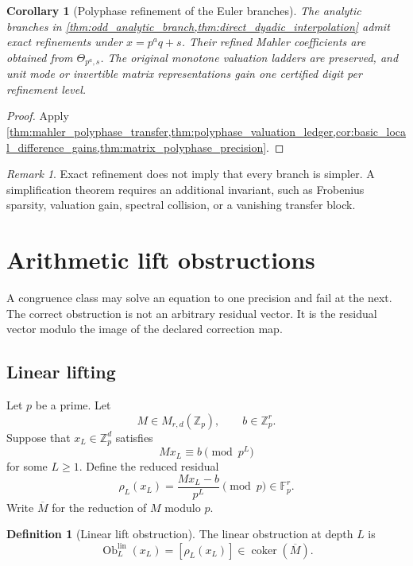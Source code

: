 \documentclass{aomart}
\newtheorem{corollary}[corollary]{Corollary}
\theoremstyle{definition}
\newtheorem{definition}[definition]{Definition}
\theoremstyle{remark}
\newtheorem{remark}[remark]{Remark}
\newcommand{\FF}{\mathbb F}
\newcommand{\Zp}{\mathbb Z_p}
\newcommand{\coker}{\operatorname{coker}}
\begin{document}
\begin{corollary}[Polyphase refinement of the Euler branches]\label{cor:euler_polyphase_refinement}
The analytic branches in \cref{thm:odd_analytic_branch,thm:direct_dyadic_interpolation} admit exact refinements under \(x=p^aq+s\). Their refined Mahler coefficients are obtained from \(\Theta_{p^a,s}\). The original monotone valuation ladders are preserved, and unit mode or invertible matrix representations gain one certified digit per refinement level.
\end{corollary}

\begin{proof}
Apply \cref{thm:mahler_polyphase_transfer,thm:polyphase_valuation_ledger,cor:basic_local_difference_gains,thm:matrix_polyphase_precision}.
\end{proof}

\begin{remark}\label{rem:polyphase_boundary}
Exact refinement does not imply that every branch is simpler. A simplification theorem requires an additional invariant, such as Frobenius sparsity, valuation gain, spectral collision, or a vanishing transfer block.
\end{remark}
\section{Arithmetic lift obstructions}\label{sec:lifting}

A congruence class may solve an equation to one precision and fail at the next. The correct obstruction is not an arbitrary residual vector. It is the residual vector modulo the image of the declared correction map.

\subsection{Linear lifting}

Let \(p\) be a prime. Let
\[
M\in M_{r,d}(\Zp),
\qquad
b\in\Zp^r.
\]
Suppose that \(x_L\in\Zp^d\) satisfies
\[
Mx_L\equiv b\pmod {p^L}
\]
for some \(L\geq1\). Define the reduced residual
\[
\rho_L(x_L)
=
\frac{Mx_L-b}{p^L}
\pmod p
\in\FF_p^r.
\]
Write \(\overline M\) for the reduction of \(M\) modulo \(p\).

\begin{definition}[Linear lift obstruction]\label{def:linear_lift_obstruction}
The linear obstruction at depth \(L\) is
\[
\boxed{
\operatorname{Ob}^{\mathrm{lin}}_L(x_L)
=
[\rho_L(x_L)]
\in
\coker(\overline M).
}
\]
\end{definition}
\end{document}

